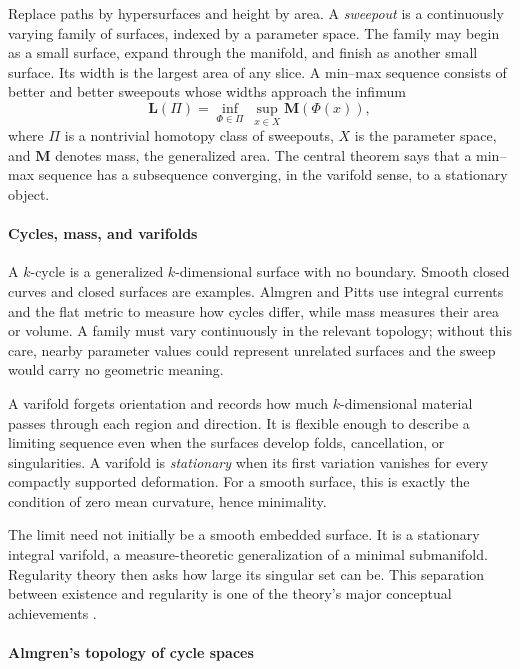 Replace paths by hypersurfaces and height by area. A \emph{sweepout} is a continuously varying family of surfaces, indexed by a parameter space. The family may begin as a small surface, expand through the manifold, and finish as another small surface. Its width is the largest area of any slice. A min--max sequence consists of better and better sweepouts whose widths approach the infimum
\[
 \mathbf L(\Pi)=\inf_{\Phi\in\Pi}\ \sup_{x\in X}\mathbf M(\Phi(x)),
\]
where $\Pi$ is a nontrivial homotopy class of sweepouts, $X$ is the parameter space, and $\mathbf M$ denotes mass, the generalized area. The central theorem says that a min--max sequence has a subsequence converging, in the varifold sense, to a stationary object.

\paragraph{Cycles, mass, and varifolds}

A $k$-cycle is a generalized $k$-dimensional surface with no boundary. Smooth closed curves and closed surfaces are examples. Almgren and Pitts use integral currents and the flat metric to measure how cycles differ, while mass measures their area or volume. A family must vary continuously in the relevant topology; without this care, nearby parameter values could represent unrelated surfaces and the sweep would carry no geometric meaning.

A varifold forgets orientation and records how much $k$-dimensional material passes through each region and direction. It is flexible enough to describe a limiting sequence even when the surfaces develop folds, cancellation, or singularities. A varifold is \emph{stationary} when its first variation vanishes for every compactly supported deformation. For a smooth surface, this is exactly the condition of zero mean curvature, hence minimality.

The limit need not initially be a smooth embedded surface. It is a stationary integral varifold, a measure-theoretic generalization of a minimal submanifold. Regularity theory then asks how large its singular set can be. This separation between existence and regularity is one of the theory's major conceptual achievements \cite{almgren_pitts_min_max_theory_ref1,almgren_pitts_min_max_theory_ref4}.

\paragraph{Almgren's topology of cycle spaces}

